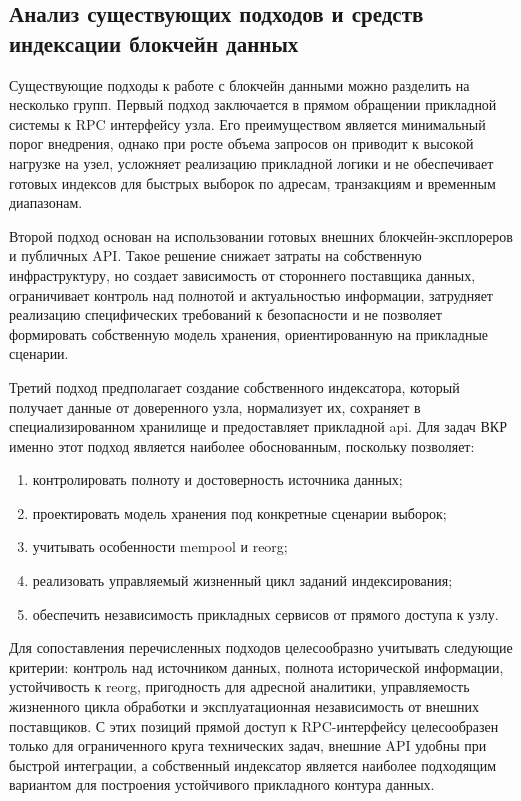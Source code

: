 ﻿\subsection{Анализ существующих подходов и средств индексации блокчейн данных}

Существующие подходы к работе с блокчейн данными можно разделить на несколько
групп. Первый подход заключается в прямом обращении прикладной системы к RPC
интерфейсу узла. Его преимуществом является минимальный порог внедрения,
однако при росте объема запросов он приводит к высокой нагрузке на узел,
усложняет реализацию прикладной логики и не обеспечивает готовых индексов для
быстрых выборок по адресам, транзакциям и временным диапазонам.

Второй подход основан на использовании готовых внешних блокчейн-эксплореров и
публичных API. Такое решение снижает затраты на собственную инфраструктуру, но
создает зависимость от стороннего поставщика данных, ограничивает контроль над
полнотой и актуальностью информации, затрудняет реализацию специфических
требований к безопасности и не позволяет формировать собственную модель
хранения, ориентированную на прикладные сценарии.

Третий подход предполагает создание собственного индексатора, который получает
данные от доверенного узла, нормализует их, сохраняет в специализированном
хранилище и предоставляет прикладной \gls{api}. Для задач ВКР именно этот
подход является наиболее обоснованным, поскольку позволяет:
\begin{enumerate}
    \item контролировать полноту и достоверность источника данных;
    \item проектировать модель хранения под конкретные сценарии выборок;
    \item учитывать особенности mempool и reorg;
    \item реализовать управляемый жизненный цикл заданий индексирования;
    \item обеспечить независимость прикладных сервисов от прямого доступа к узлу.
\end{enumerate}

Для сопоставления перечисленных подходов целесообразно учитывать следующие
критерии: контроль над источником данных, полнота исторической информации,
устойчивость к reorg, пригодность для адресной аналитики, управляемость
жизненного цикла обработки и эксплуатационная независимость от внешних
поставщиков. С этих позиций прямой доступ к RPC-интерфейсу целесообразен
только для ограниченного круга технических задач, внешние API удобны при
быстрой интеграции, а собственный индексатор является наиболее подходящим
вариантом для построения устойчивого прикладного контура данных.

